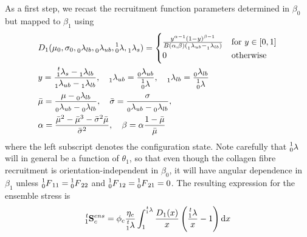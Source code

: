         
    As a first step, we recast the recruitment function parameters determined in $\beta_0$ but mapped to $\beta_1$ using
        \begin{equation}\label{c3:eqn:43}
        \begin{aligned}
        &D_1(\mu_0, \sigma_0, \prescript{}{0}{\lambda}_{lb}, \prescript{}{0}{\lambda}_{ub}, \prescript{1}{0}{\lambda}, \prescript{}{1}{\lambda}_s) = 
            \begin{cases}
            \frac{y^{\alpha-1}(1-y)^{\beta-1}}{B(\alpha,\beta)(\prescript{}{1}{\lambda}_{ub}-\prescript{}{1}{\lambda}_{lb})} & \text{for } y \in [0,1] \\
            0 & \text{otherwise}
            \end{cases} \\
        &y=\frac{\prescript{t}{1}{\lambda}_s-\prescript{}{1}{\lambda}_{lb}}{\prescript{}{1}{\lambda}_{ub}- \prescript{}{1}{\lambda}_{lb}}, 
        \quad \prescript{}{1}{\lambda}_{ub} = \frac{\prescript{}{0}{\lambda}_{ub}}{\prescript{1}{0}{\lambda}}, 
        \quad \prescript{}{1}{\lambda}_{lb} = \frac{\prescript{}{0}{\lambda}_{lb}}{\prescript{1}{0}{\lambda}}   \\
        &\bar{\mu} =\frac{\mu - \prescript{}{0}{\lambda}_{lb}}{\prescript{}{0}{\lambda}_{ub}-\prescript{}{0}{\lambda}_{lb}},
        \quad \bar{\sigma} = \frac{\sigma}{\prescript{}{0}{\lambda}_{ub} - \prescript{}{0}{\lambda}_{lb}}, \\
        &\alpha = \frac{\bar{\mu}^2 - \bar{\mu}^3 - \bar{\sigma}^2\bar{\mu}}{\bar{\sigma}^2},  
        \quad \beta = \alpha \frac{1-\bar{\mu}}{\bar{\mu}}
        \end{aligned}
        \end{equation}
    where the left subscript denotes the configuration state. Note carefully that $\prescript{1}{0}{\lambda}$ will in general be a function of $\theta_1$, so that even though the collagen fibre recruitment is orientation-independent in $\beta_0$, it will have angular dependence in $\beta_1$ unless $\prescript{1}{0}{F}_{11} = \prescript{1}{0}{F}_{22}$ and $\prescript{1}{0}{F}_{12} = \prescript{1}{0}{F}_{21} = 0$. The resulting expression for the ensemble stress is
        \begin{equation}\label{c3:eqn:44}
        \begin{aligned}
        \prescript{t}{1}{\mathbf{S}}_c^{ens} = \phi_c\frac{\eta_c}{\prescript{t}{1}{\lambda}}
            \int_1^{\prescript{t}{1}{\lambda}} \frac{D_1(x)}{x}\left(\frac{\prescript{t}{1}{\lambda}}{x} - 1\right) \dif x
        \end{aligned}
        \end{equation}
